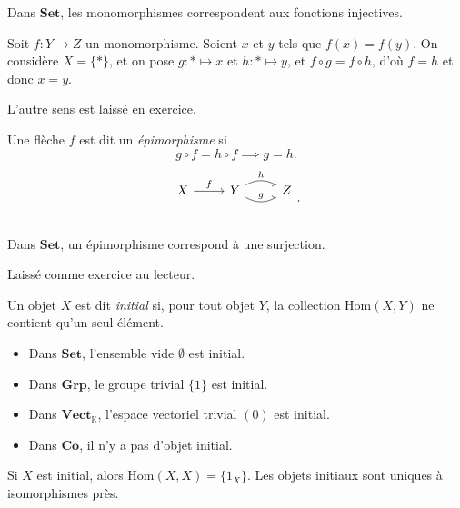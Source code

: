 \begin{prop}
  Dans $\mathbf{Set}$, les monomorphismes correspondent aux fonctions injectives.
\end{prop}

\begin{prv}
  Soit $f : Y \to Z$ un monomorphisme.
  Soient $x$ et $y$ tels que $f(x) = f(y)$.
  On considère $X = \{*\}$, et on pose $g : * \mapsto x$ et $h : * \mapsto y$, et $f \circ g = f \circ h$, d'où  $f = h$ et donc  $x = y$.

  L'autre sens est laissé en exercice.
\end{prv}

\begin{defn}
  Une flèche $f$ est dit un \textit{épimorphisme} si \[
    g \circ f = h \circ f \implies g = h
  .\]
  \[
    \begin{tikzcd}
      X \arrow{r}{f} & Y \arrow[bend right]{r}{g} \arrow[bend left]{r}{h} & Z\\
    \end{tikzcd}
  .\]
\end{defn}

\begin{prop}
  Dans $\mathbf{Set}$, un épimorphisme correspond à une surjection.
\end{prop}

\begin{prv}
  Laissé comme exercice au lecteur.
\end{prv}

\begin{defn}
  Un objet $X$ est dit \textit{initial} si, pour tout objet $Y$, la collection $\mathrm{Hom}(X,Y)$ ne contient qu'un seul élément.
\end{defn}

\begin{exm}
  \begin{itemize}
    \item Dans $\mathbf{Set}$, l'ensemble vide $\emptyset$ est initial.
    \item Dans $\mathbf{Grp}$, le groupe trivial $\{1\}$ est initial.
    \item Dans $\mathbf{Vect}_\mathds{K}$, l'espace vectoriel trivial $( 0 )$ est initial.
    \item Dans $\mathbf{Co}$, il n'y a pas d'objet initial.
  \end{itemize}
\end{exm}

\begin{prop}
  Si $X$ est initial, alors $\mathrm{Hom}(X,X) = \{1_X\}$.
  Les objets initiaux sont uniques à isomorphismes près.
\end{prop}

